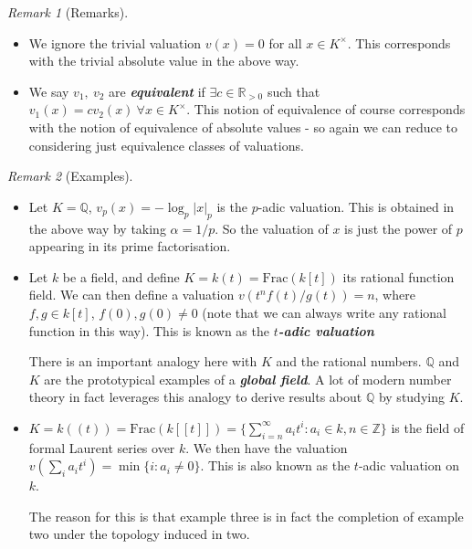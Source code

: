 \documentclass[]{article}
\theoremstyle{custhm}
\theoremstyle{cusdef}
\theoremstyle{custhm}
\theoremstyle{custhm}
\theoremstyle{custhm}
\theoremstyle{custhm}
\theoremstyle{cusdef}
\theoremstyle{remark}
\newtheorem*{remark*}{Remark}
\newcommand{\Z}{\mathbb{Z}}
\newcommand{\Q}{\mathbb{Q}}
\newcommand{\R}{\mathbb{R}}
\newcommand{\undf}[1]{\textit{\textbf{#1}}}
\begin{document}
\begin{remark*}[Remarks]
\begin{itemize}
	\item We ignore the trivial valuation $v(x) = 0$ for all $x\in K^\times$. This corresponds with the trivial absolute value in the above way.
	\item We say $v_1,\ v_2$ are \undf{equivalent} if $\exists c \in \R_{>0}$ such that $v_1(x) = cv_2(x)\ \forall x \in K^\times$. This notion of equivalence of course corresponds with the notion of equivalence of absolute values - so again we can reduce to considering just equivalence classes of valuations.
\end{itemize}
\end{remark*}
\begin{remark*}[Examples]
	\begin{itemize}
		\item Let $K = \Q$, $v_p(x) = -\log_p|x|_p$ is the $p$-adic valuation. This is obtained in the above way by taking $\alpha = 1/p$. So the valuation of $x$ is just the power of $p$ appearing in its prime factorisation.
		\item Let $k$ be a field, and define $K = k(t) = \textrm{Frac}(k[t])$ its rational function field. We can then define a valuation $v\left(t^nf(t)/g(t)\right) = n$, where $f,g\in k[t]$, $f(0),g(0)\ne 0$ (note that we can always write any rational function in this way). This is known as the \undf{$t$-adic valuation}
		
		There is an important analogy here with $K$ and the rational numbers. $\Q$ and $K$ are the prototypical examples of a \undf{global field}. A lot of modern number theory in fact leverages this analogy to derive results about $\Q$ by studying $K$.
		
		\item $K = k((t)) = \textrm{Frac}(k[[t]]) = \{ \sum_{i=n}^{\infty}a_it^i : a_i \in k, n\in \Z \}$ is the field of formal Laurent series over $k$. We then have the valuation $v\left(\sum_{i}a_it^i\right) = \min\{i:a_i\ne 0\}$. This is also known as the $t$-adic valuation on $k$.
		
		The reason for this is that example three is in fact the completion of example two under the topology induced in two.
	\end{itemize}
\end{remark*}
\end{document}
